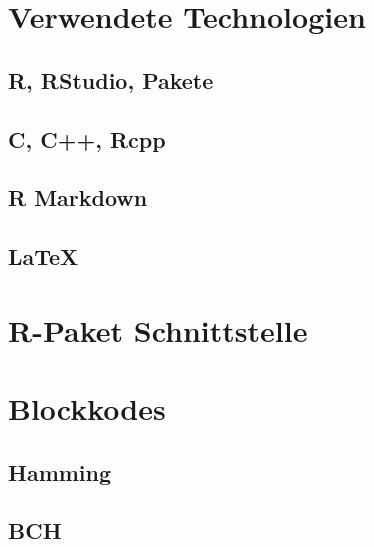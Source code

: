 
\section{Verwendete Technologien}
\label{section:technologies}

\subsection{R, RStudio, Pakete}
\subsection{C, C++, Rcpp}
\subsection{R Markdown}
\subsection{\LaTeX}


\section{R-Paket Schnittstelle}
\label{section:interface}

\section{Blockkodes}
\label{section:impl_block}

\subsection{Hamming}
\subsection{BCH}



